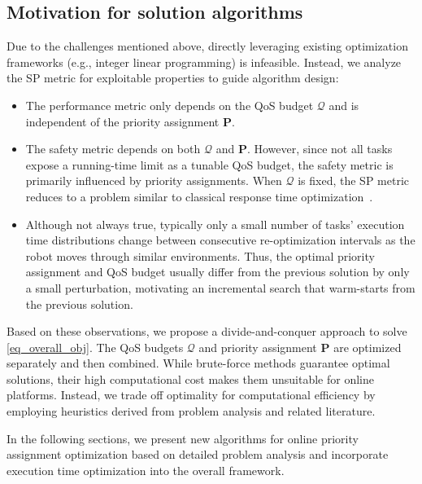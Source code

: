 	\subsection{Motivation for solution algorithms}
    Due to the challenges mentioned above, directly leveraging existing optimization frameworks (e.g., integer linear programming) is infeasible.
    Instead, we analyze the SP metric for exploitable properties to guide algorithm design:
	\begin{itemize}
		\item The performance metric only depends on the QoS budget $\boldsymbol{\mathcal{Q}}$ and is independent of the priority assignment $\boldsymbol{P}$.
		\item The safety metric depends on both $\boldsymbol{\mathcal{Q}}$ and $\boldsymbol{P}$.
        However, since not all tasks expose a running-time limit as a tunable QoS budget, the safety metric is primarily influenced by priority assignments.
        When $\boldsymbol{\mathcal{Q}}$ is fixed, the SP metric reduces to a problem similar to classical response time optimization~\cite{Zhao2020AnOF, Wang2023RTAS}.
		\item Although not always true, typically only a small number of tasks' execution time distributions change between consecutive re-optimization intervals as the robot moves through similar environments.
        Thus, the optimal priority assignment and QoS budget usually differ from the previous solution by only a small perturbation, motivating an incremental search that warm-starts from the previous solution.
	\end{itemize}
    Based on these observations, we propose a divide-and-conquer approach to solve \eqref{eq_overall_obj}.
    The QoS budgets $\boldsymbol{\mathcal{Q}}$ and priority assignment $\boldsymbol{P}$ are optimized separately and then combined.
    While brute-force methods guarantee optimal solutions, their high computational cost makes them unsuitable for online platforms.
    Instead, we trade off optimality for computational efficiency by employing heuristics derived from problem analysis and related literature.

    In the following sections, we present new algorithms for online priority assignment optimization based on detailed problem analysis and incorporate execution time optimization into the overall framework.
